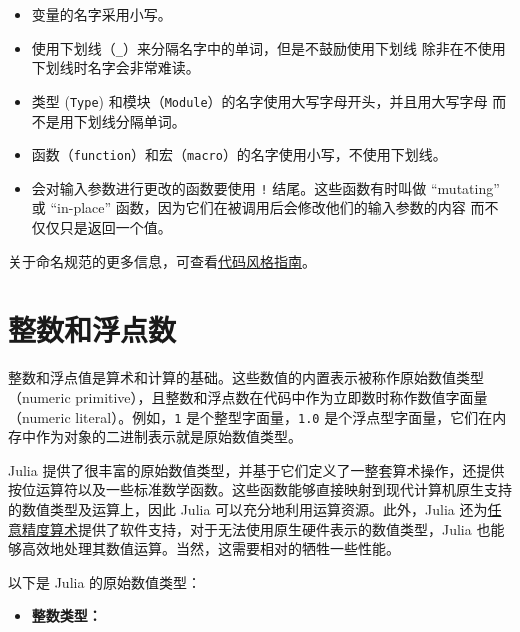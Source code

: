 \begin{itemize}
\item 变量的名字采用小写。


\item 使用下划线（\texttt{{\textquotesingle}\_{\textquotesingle}}）来分隔名字中的单词，但是不鼓励使用下划线 除非在不使用下划线时名字会非常难读。


\item 类型 (\texttt{Type}) 和模块（\texttt{Module}）的名字使用大写字母开头，并且用大写字母 而不是用下划线分隔单词。


\item 函数（\texttt{function}）和宏（\texttt{macro}）的名字使用小写，不使用下划线。


\item 会对输入参数进行更改的函数要使用 \texttt{!} 结尾。这些函数有时叫做 “mutating” 或 “in-place” 函数，因为它们在被调用后会修改他们的输入参数的内容 而不仅仅只是返回一个值。

\end{itemize}


关于命名规范的更多信息，可查看\hyperlink{12507952184948113283}{代码风格指南}。



\hypertarget{9431281250101057989}{}


\chapter{整数和浮点数}



整数和浮点值是算术和计算的基础。这些数值的内置表示被称作原始数值类型（numeric primitive），且整数和浮点数在代码中作为立即数时称作数值字面量（numeric literal）。例如，\texttt{1} 是个整型字面量，\texttt{1.0} 是个浮点型字面量，它们在内存中作为对象的二进制表示就是原始数值类型。



Julia 提供了很丰富的原始数值类型，并基于它们定义了一整套算术操作，还提供按位运算符以及一些标准数学函数。这些函数能够直接映射到现代计算机原生支持的数值类型及运算上，因此 Julia 可以充分地利用运算资源。此外，Julia 还为\href{@ref}{任意精度算术}提供了软件支持，对于无法使用原生硬件表示的数值类型，Julia 也能够高效地处理其数值运算。当然，这需要相对的牺牲一些性能。



以下是 Julia 的原始数值类型：



\begin{itemize}
\item \textbf{整数类型：}

\end{itemize}



